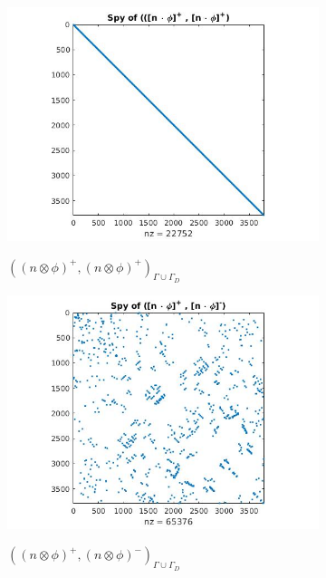 \documentclass[a4paper,openany]{book}
\begin{document}
\begin{figure}
  \begin{subfigure}{0.5\textwidth}
    \includegraphics[width=\linewidth]{figure21.jpg}
    \label{fig:figure21}
	\caption{$((n \otimes \phi)^+,(n \otimes \phi)^+)_{\Gamma \cup \Gamma_D}$}      
  \end{subfigure}
  \begin{subfigure}{0.5\textwidth}
    \includegraphics[width=\linewidth]{figure22.jpg}
    \label{fig:figure22}
	\caption{$((n \otimes \phi)^+,(n \otimes \phi)^-)_{\Gamma \cup \Gamma_D}$}      
  \end{subfigure}
    \begin{subfigure}{0.5\textwidth}

\end{subfigure}
\end{figure}
\end{document}
